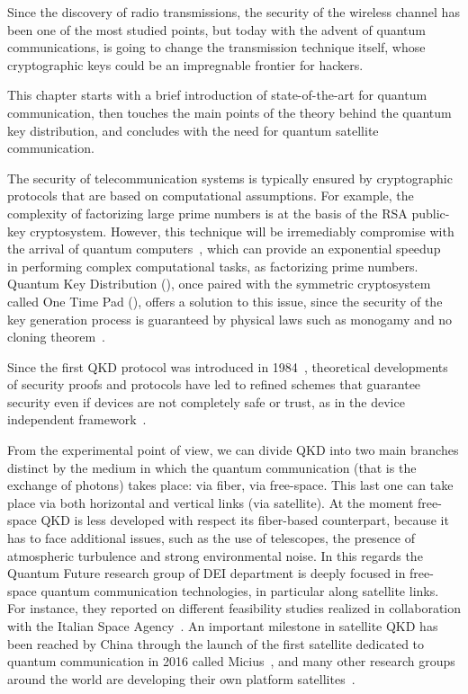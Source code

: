 
Since the discovery of radio transmissions, the security of the wireless channel has been one of the most studied points, but today with the advent of quantum communications, is going to change the transmission technique itself, whose cryptographic keys could be an impregnable frontier for hackers.

This chapter starts with a brief introduction of state-of-the-art for quantum communication, then touches the main points of the theory behind the quantum key distribution, and concludes with the need for quantum satellite communication.


The security of telecommunication systems is typically ensured by cryptographic protocols that are based on computational assumptions. For example, the complexity of factorizing large prime numbers is at the basis of the RSA public-key cryptosystem. However, this technique will be irremediably compromise with the arrival of quantum computers~\cite{a1,a2,a3}, which can provide an exponential speedup~\cite{a4} in performing complex computational tasks, as factorizing prime numbers. Quantum Key Distribution (), once paired with the symmetric cryptosystem called One Time Pad (), offers a solution to this issue, since the security of the key generation process is guaranteed by physical laws such as monogamy and no cloning theorem~\cite{a5}.

Since the first QKD protocol was introduced in 1984~\cite{a6}, theoretical developments of security proofs and protocols have led to refined schemes that guarantee security even if devices are not completely safe or trust, as in the device independent framework~\cite{a5,a6,a7,a8,a9,a10,a11}.

From the experimental point of view, we can divide QKD into two main branches distinct by the medium in which the quantum communication (that is the exchange of photons) takes place: via fiber, via free-space. This last one can take place via both horizontal and vertical links (via satellite). At the moment free-space QKD is less developed with respect its fiber-based counterpart, because it has to face additional issues, such as the use of telescopes, the presence of atmospheric turbulence and strong environmental noise. In this regards the Quantum Future research group of DEI department is deeply focused in free-space quantum communication technologies, in particular along satellite links. For instance, they reported on different feasibility studies realized in collaboration with the Italian Space Agency~\cite{a12,a13,a14}. An important milestone in satellite QKD has been reached by China through the launch of the first satellite dedicated to quantum communication in 2016 called Micius~\cite{a15}, and many other research groups around the world are developing their own platform satellites~\cite{a16,a17,a18}.

